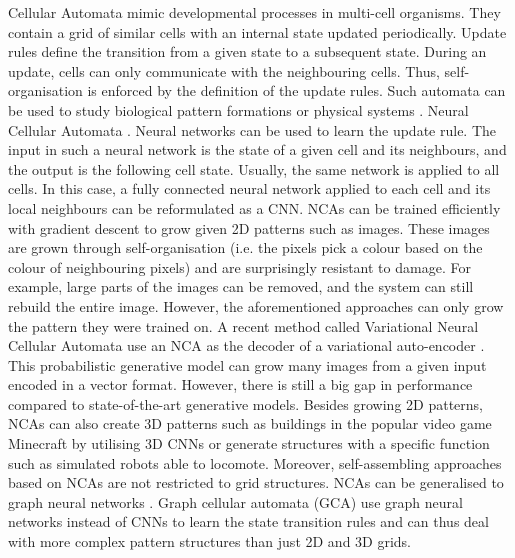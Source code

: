 Cellular Automata mimic developmental processes in multi-cell organisms.
They contain a grid of similar cells with an internal state updated periodically.
Update rules define the transition from a given state to a subsequent state.
During an update, cells can only communicate with the neighbouring cells.
Thus, self-organisation is enforced by the definition of the update rules.
Such automata can be used to study biological pattern formations  or physical systems .
Neural Cellular Automata .  Neural networks can be used to learn the update rule.
The input in such a neural network is the state of a given cell and its neighbours, and the output is the following cell state.
Usually, the same network is applied to all cells.
In this case, a fully connected neural network applied to each cell and its local neighbours can be reformulated as a CNN.
NCAs can be trained efficiently with gradient descent to grow given 2D patterns such as images.
These images are grown through self-organisation (i.e. the pixels pick a colour based on the colour of neighbouring pixels) and are surprisingly resistant to damage.
For example, large parts of the images can be removed, and the system can still rebuild the entire image.
However, the aforementioned approaches can only grow the pattern they were trained on.
A recent method called Variational Neural Cellular Automata  use an NCA as the decoder of a variational auto-encoder .
This probabilistic generative model can grow many images from a given input encoded in a vector format.
However, there is still a big gap in performance compared to state-of-the-art generative models.
Besides growing 2D patterns, NCAs can also create 3D patterns such as buildings in the popular video game Minecraft by utilising 3D CNNs  or generate structures with a specific function such as simulated robots able to locomote.
Moreover, self-assembling approaches based on NCAs are not restricted to grid structures.
NCAs can be generalised to graph neural networks .
Graph cellular automata (GCA) use graph neural networks  instead of CNNs to learn the state transition rules and can thus deal with more complex pattern structures than just 2D and 3D grids.
